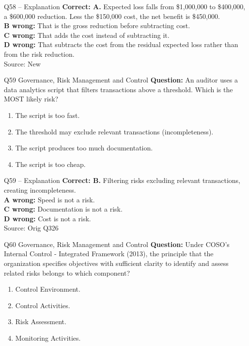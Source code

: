 \documentclass[aspectratio=169,10pt]{beamer}
\begin{document}
\begin{frame}[t]{Q58 -- Explanation}
	\footnotesize
	\textbf{Correct: A.} Expected loss falls from \$1,000,000 to \$400,000, a \$600,000 reduction. Less the \$150,000 cost, the net benefit is \$450,000. \\[5pt]
\textbf{B wrong:} That is the gross reduction before subtracting cost. \\[3pt]
\textbf{C wrong:} That adds the cost instead of subtracting it. \\[3pt]
\textbf{D wrong:} That subtracts the cost from the residual expected loss rather than from the risk reduction. \\[3pt]
	\vfill {\tiny Source: New}
\end{frame}

\begin{frame}[t]{Q59 \hfill {\scriptsize Governance, Risk Management and Control}}
	\small
	\textbf{Question:} An auditor uses a data analytics script that filters transactions above a threshold. Which is the MOST likely risk?
	\begin{enumerate}[label=\Alph*.,itemsep=1pt,topsep=3pt]
			\item The script is too fast.
			\item The threshold may exclude relevant transactions (incompleteness).
			\item The script produces too much documentation.
			\item The script is too cheap.
	\end{enumerate}
\end{frame}

\begin{frame}[t]{Q59 -- Explanation}
	\footnotesize
	\textbf{Correct: B.} Filtering risks excluding relevant transactions, creating incompleteness. \\[5pt]
\textbf{A wrong:} Speed is not a risk. \\[3pt]
\textbf{C wrong:} Documentation is not a risk. \\[3pt]
\textbf{D wrong:} Cost is not a risk. \\[3pt]
	\vfill {\tiny Source: Orig Q326}
\end{frame}

\begin{frame}[t]{Q60 \hfill {\scriptsize Governance, Risk Management and Control}}
	\small
	\textbf{Question:} Under COSO's Internal Control - Integrated Framework (2013), the principle that the organization specifies objectives with sufficient clarity to identify and assess related risks belongs to which component?
	\begin{enumerate}[label=\Alph*.,itemsep=1pt,topsep=3pt]
			\item Control Environment.
			\item Control Activities.
			\item Risk Assessment.
			\item Monitoring Activities.
	\end{enumerate}
\end{frame}
\end{document}
